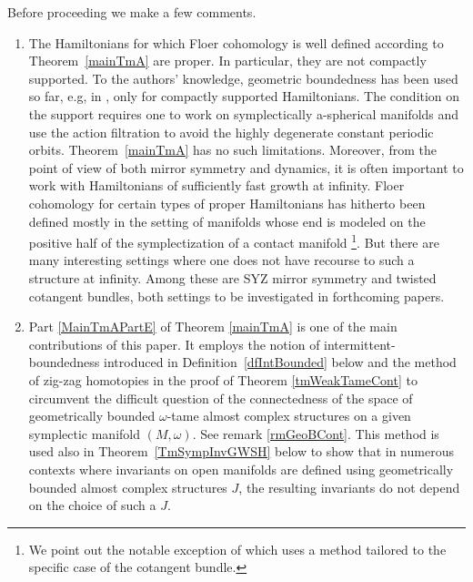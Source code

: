 \documentclass[11pt]{amsart}
\theoremstyle{definition}
\theoremstyle{remark}
\begin{document}
Before proceeding  we make a few comments.
\begin{enumerate}[wide, labelwidth=!, labelindent=10pt]
\item The Hamiltonians for which Floer cohomology is well defined according to Theorem~\ref{mainTmA} are proper. In particular, they are not compactly supported. To the authors' knowledge, geometric boundedness has been used so far, e.g, in \cite{CielFloerHofer}, only for compactly supported Hamiltonians. The condition on the support requires one to work on symplectically a-spherical manifolds and use the action filtration to avoid the highly degenerate constant periodic orbits. Theorem~\ref{mainTmA} has no such limitations. Moreover, from the point of view of both mirror symmetry and dynamics, it is often important to work with Hamiltonians of sufficiently fast growth at infinity. Floer cohomology for certain types of proper Hamiltonians has hitherto been defined mostly in the setting of manifolds whose end is modeled on the positive half of the symplectization of a contact manifold \cite{Viterbo99,Ritter10}\footnote{We point out the notable exception of \cite{AbondandoloSchwartz06} which uses a method tailored to the specific case of the cotangent bundle.}. But there are many interesting settings where one does not have recourse to such a structure at infinity. Among these are SYZ mirror symmetry and twisted cotangent bundles, both settings to be investigated in forthcoming papers.
\item Part \ref{MainTmAPartE} of Theorem \ref{mainTmA} is one of the main contributions of this paper. It employs the notion of intermittent-boundedness introduced in Definition~\ref{dfIntBounded} below and the method of zig-zag homotopies in the proof of Theorem \ref{tmWeakTameCont} to circumvent the difficult question of the connectedness of the space of geometrically bounded $\omega$-tame almost complex structures on a given symplectic manifold $(M,\omega)$. See remark \ref{rmGeoBCont}. This method is used also in Theorem~\ref{TmSympInvGWSH} below to show that in numerous contexts where invariants on open manifolds are defined using geometrically bounded almost complex structures $J$, the resulting invariants do not depend on the choice of such a $J$.
\end{enumerate}
\end{document}
